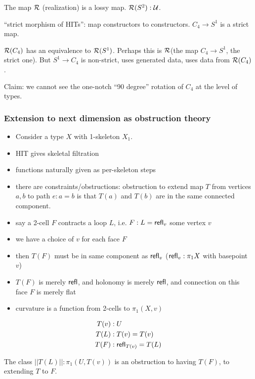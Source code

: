 \documentclass[12pt,fleqn]{article}
\begin{document}
The map \( \mathcal{R} \) (realization) is a lossy map. \( \mathcal{R}(S^2):\mathcal{U}  \).

``strict morphism of HITs'': map constructors to constructors. \( C_4\to S^1 \) is a strict map.

\( \mathcal{R}(C_4) \) has an equivalence to \( \mathcal{R}(S^1) \). Perhaps this is \( \mathcal{R} \)(the map \( C_4\to S^1 \), the strict one). But \( S^1\to C_4 \) is non-strict, uses generated data, uses data from \( \mathcal{R}(C_4) \).

Claim: we cannot see the one-notch ``90 degree'' rotation of \( C_4 \) at the level of types.

\subsubsection{Extension to next dimension as obstruction theory}

\begin{itemize}
\item Consider a type \( X \) with 1-skeleton \( X_1 \).
\item HIT gives skeletal filtration
\item functions naturally given as per-skeleton steps
\item there are constraints/obstructions: obstruction to extend map \( T \) from vertices \( a, b \) to path \( e:a=b \) is that \( T(a) \) and \( T(b) \) are in the same connected component.
\item say a 2-cell \( F \) contracts a loop \( L \), i.e. \( F:L=\mathsf{refl}_v \) some vertex \( v \)
\item we have a choice of \( v \) for each face \( F \)
\item then \( T(F) \) must be in same component as \( \mathsf{refl}_v \) (\( \mathsf{refl}_v:\pi_1 X \) with basepoint \( v \))
\item \( T(F) \) is merely \( \mathsf{refl} \), and holonomy is merely \( \mathsf{refl} \), and connection on this face \( F \) is merely flat
\item curvature is a function from 2-cells to \( \pi_1(X,v) \)
\end{itemize}

\begin{align*}
T(v)&:U\\
T(L)&:T(v)=T(v)\\
T(F)&:\mathsf{refl}_{T(v)}=T(L)
\end{align*}

The class \( ||T(L)||:\pi_1(U,T(v)) \) is an obstruction to having \( T(F) \), to extending \( T \) to \( F \).
\end{document}
